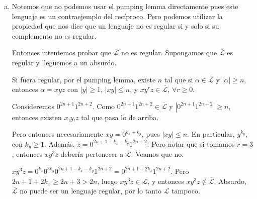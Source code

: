 \documentclass[hidelinks,a4paper,10pt, nofootinbib]{article}
\newcommand{\ele}{\mathcal{L}}
\newcommand{\elecomp}{\overline{\ele}}
\begin{document}
\begin{enumerate}[a.]
\item Notemos que no podemos usar el pumping lemma directamente pues este lenguaje es un contraejemplo del recíproco.
Pero podemos utilizar la propiedad que nos dice que un lenguaje no es regular si y solo si su complemento no es regular.

Entonces intentemos probar que $\overline{\ele}$ no es regular.
Supongamos que $\overline{\ele}$ es regular y lleguemos a un absurdo.

Si fuera regular, por el pumping lemma,
  existe $n$ tal que si $\alpha \in \elecomp$ y $|\alpha| \geq n$,
  entonces $\alpha = xyz$ con $|y| \geq 1$, $|x y| \leq n$, y $xy^rz \in \elecomp$, $\forall r \geq 0$.

Consideremos $0^{2n+1}1^{2n+2}$. Como $0^{2n+1}1^{2n+2} \in \elecomp$ y $|0^{2n+1}1^{2n+2}| \geq n$,
entonces existen $x$,$y$,$z$ tal que pasa lo de arriba.

Pero entonces necesariamente $xy = 0^{k_x + k_y}$, pues $|x y| \leq n$.
En particular, $y^{k_y}$, con $k_y \geq 1$. Además, $z = 0^{2n+1-k_x-k_y}1^{2n+2}$.
Pero notar que si tomamos $r = 3$, entonces $xy^3z$ debería pertenecer a $\elecomp$. Veamos que no.

$xy^3z = 0^{k_x} 0^{3 k_y} 0^{2n+1-k_x-k_y}1^{2n+2} = 0^{2n+1+2k_x} 1^{2n+2}$.
Pero $2n + 1 + 2k_x \geq 2n + 3 > 2n$, luego $xy^3z \in \ele$, y entonces $xy^3z \not\in \elecomp$.
Absurdo, $\elecomp$ no puede ser un lenguaje regular, por lo tanto $\ele$ tampoco.


\end{enumerate}
\end{document}
